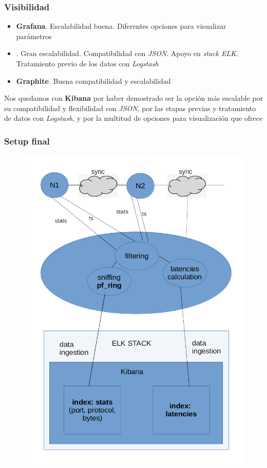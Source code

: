 \documentclass{beamer}
\begin{document}
\begin{frame}
\frametitle{Visibilidad}

\begin{itemize}
	\item \textbf{Grafana}. Escalabilidad buena. Diferentes opciones para visualizar parámetros
	\item \textbf{\color{purple}{Kibana}}. Gran escalabilidad. Compatibilidad con \textit{JSON}. Apoyo en \textit{stack ELK}. Tratamiento previo de los datos con \textit{Logstash}
	\item \textbf{Graphite}. Buena compatibilidad y escalabilidad
\end{itemize}

Nos quedamos con \textbf{Kibana} por haber demostrado ser la opción más escalable por su compatibilidad y flexibilidad con \textit{JSON}, por las etapas previas y tratamiento de datos con \textit{Logstash}, y por la multitud de opciones para visualización que ofrece

\end{frame}


\begin{frame}
\frametitle{Setup final}

\begin{figure}[H]
	\centering
	\includegraphics[scale=0.2]{sistema-final.png}
	\label{sistema-final}
\end{figure}

\end{frame}
\end{document}
